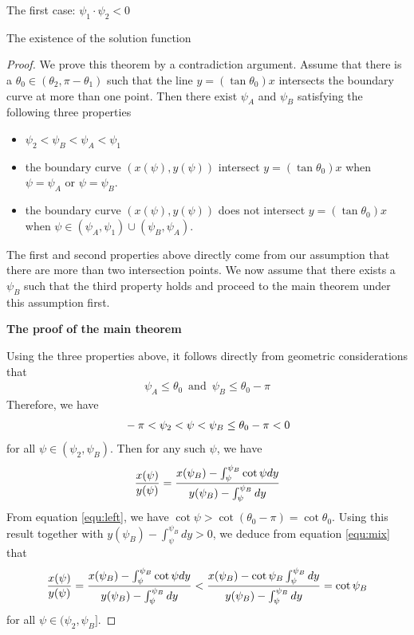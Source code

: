 \documentclass[letterpaper,reqno,10pt,twoside]{amsart}
\theoremstyle{definition}
\theoremstyle{remark}
\begin{document}
\begin{section}{The first case: $\psi_1\cdot \psi_2<0$ }
\begin{subsection}{The existence of the solution function}
\begin{proof}
  We prove this theorem by a contradiction argument. Assume that there is a $\theta_{0}\in (\theta_{2},\pi-\theta_{1})$ such that the line $y=(\tan\theta_{0}) x$ intersects the boundary curve at more than one point.  Then there exist $\psi_{A}$ and $\psi_{B}$ satisfying the following three properties
  \begin{itemize}
      \item $\psi_{2}<\psi_{B}<\psi_{A}<\psi_{1}$
      \item the boundary curve $(x(\psi),y(\psi))$ intersect $y=(\tan\theta_{0}) x$ when $\psi=\psi_{A}$ or $\psi=\psi_{B}$.
      \item the boundary curve $(x(\psi),y(\psi))$ does not intersect $y=(\tan\theta_{0}) x$ when $\psi\in (\psi_{A},\psi_{1})\cup (\psi_{B},\psi_{A})$. 
  \end{itemize} 
  The first and second properties above directly come from our assumption that there are more than two intersection points. We now assume that there exists a $\psi_{B}$ such that the third property holds and proceed to the main theorem under this assumption first.
  
  \textbf{The proof of the main theorem}

  Using the three properties above, it follows directly from geometric considerations that
  \begin{align}
      \psi_{A}\leq\theta_{0}~\operatorname{and}~\psi_{B}\leq\theta_{0}-\pi
  \end{align}
  \noindent Therefore, we have
  \begin{align}{\label{equ:left}}
      -\pi<\psi_{2}<\psi<\psi_{B}\leq\theta_{0}-\pi<0
  \end{align}
  \noindent for all $\psi\in (\psi_{2},\psi_{B})$. Then for any such $\psi$, we have
  \begin{align}{\label{equ:mix}}
      \frac{x(\psi)}{y(\psi)}=\frac{x(\psi_{B})-\int_{\psi}^{\psi_{B}}\cot\psi dy}{y(\psi_{B})-\int_{\psi}^{\psi_{B}}dy}
  \end{align}
  \noindent From equation \eqref{equ:left}, we have $\cot\psi>\cot(\theta_{0}-\pi)=\cot\theta_{0}$. Using this result together with $y(\psi_{B})-\int_{\psi}^{\psi_{B}}dy>0$, we deduce from equation \eqref{equ:mix} that
  \begin{align}{\label{equ:cot}}
      \frac{x(\psi)}{y(\psi)}=\frac{x(\psi_{B})-\int_{\psi}^{\psi_{B}}\cot\psi dy}{y(\psi_{B})-\int_{\psi}^{\psi_{B}}dy}<\frac{x(\psi_{B})-\cot\psi_{B}\int_{\psi}^{\psi_{B}} dy}{y(\psi_{B})-\int_{\psi}^{\psi_{B}}dy}=\cot\psi_{B}
  \end{align}
  \noindent for all $\psi\in(\psi_{2},\psi_{B}]$. 
  

\end{proof}
\end{subsection}
\end{section}
\end{document}
